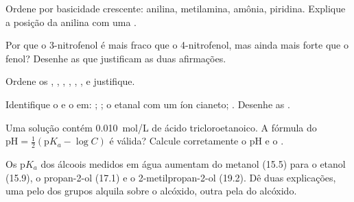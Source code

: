 \begin{exercise}[$\star\star$]\label{exo:b1:electronic-effects:6}
Ordene por basicidade crescente: anilina, metilamina, amônia, piridina.
Explique a posição da anilina com uma .
\end{exercise}

\begin{exercise}[$\star\star$]\label{exo:b1:electronic-effects:7}
Por que o 3-nitrofenol é mais fraco que o 4-nitrofenol, mas ainda mais
forte que o fenol? Desenhe as  que justificam
as duas afirmações.
\end{exercise}

\begin{exercise}[$\star\star$]\label{exo:b1:electronic-effects:8}
Ordene os  , , ,
, , , e justifique.
\end{exercise}

\begin{exercise}[$\star\star$]\label{exo:b1:electronic-effects:9}
Identifique o  e o  em: ;
; o etanal com um íon cianeto; . Desenhe as
.
\end{exercise}

\begin{exercise}[$\star\star\star$]\label{exo:b1:electronic-effects:10}
Uma solução contém \qty{0.010}{mol/L} de ácido tricloroetanoico. A
fórmula do  $\mathrm{pH} = \frac12(\mathrm{p}K_a - \log C)$ é
válida? Calcule corretamente o pH e o .
\end{exercise}

\begin{exercise}[$\star\star\star$]\label{exo:b1:electronic-effects:11}
Os $\mathrm{p}K_a$ dos álcoois medidos em água aumentam do metanol
(15.5) para o etanol (15.9), o propan-2-ol (17.1) e o 2-metilpropan-2-ol
(19.2). Dê duas explicações, uma pelo  dos grupos alquila
sobre o alcóxido, outra pela  do alcóxido.
\end{exercise}

